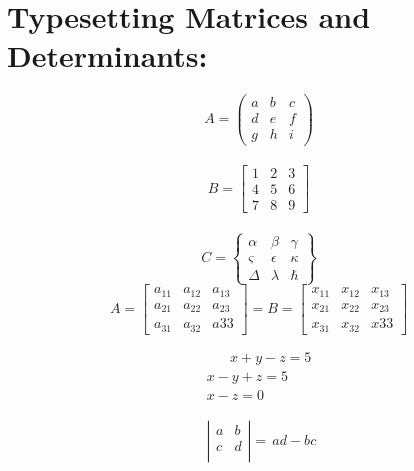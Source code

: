 \documentclass[12 pt,a4paper]{report}
\begin{document}
\section{Typesetting Matrices and Determinants:}
$$
A=
\left(
\begin{array}{ccc}
a & b & c\\
d & e & f\\
g & h & i
\end{array}
\right)
$$\\
$$
B=
\left[
\begin{array}{ccc}
1 & 2 & 3\\
4 & 5 & 6\\
7 & 8 & 9
\end{array}
\right]
$$\\
$$
C=
\left\lbrace
\begin{array}{ccc}
\alpha & \beta & \gamma\\
\varsigma & \epsilon & \kappa\\
\Delta & \lambda & \hbar
\end{array}
\right\rbrace
$$
$$
A=              
\left[
\begin{array}{ccc}
a_{11} & a_{12} & a_{13}\\
a_{21} & a_{22} & a_{23}\\
a_{31} & a_{32} & a{33}
\end{array}
\right]
=
B=
\left[
\begin{array}{ccc}
x_{11} & x_{12} & x_{13}\\
x_{21} & x_{22} & x_{23}\\
x_{31} & x_{32} & x{33}
\end{array}
\right]
$$

\begin{eqnarray}
\,\,\,\,\,\,\,\,\,\,x+y-z=5\\
x-y+z=5\\
x-z=0
\end{eqnarray}


\begin{eqnarray*}
\,\,\left|
\begin{array}{cc}
a & b\\
c & d\\
\end{array}
\right|=\,ad-bc
\end{eqnarray*}
\end{document}

